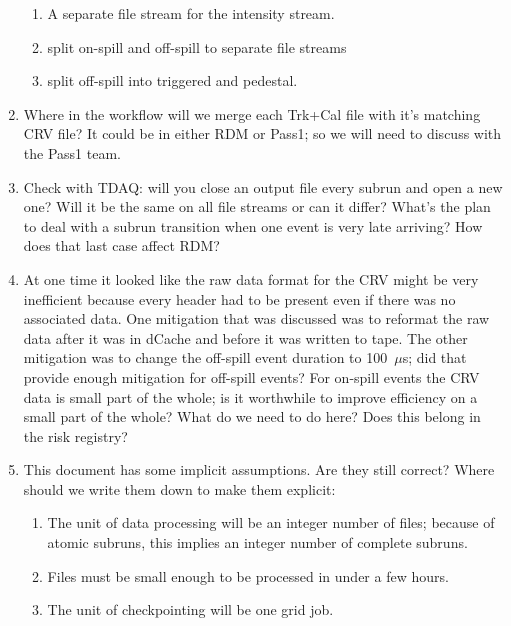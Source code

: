 \begin{enumerate}
\begin{enumerate}
      \item A separate file stream for the intensity stream.
      \item split on-spill and off-spill to separate file streams
      \item split off-spill into triggered and pedestal.
    \end{enumerate}
  \item Where in the workflow will we merge each Trk+Cal file with it's matching CRV file?
    It could be in either RDM or Pass1; so we will need to discuss with the Pass1 team.
  \item Check with TDAQ: will you close an output file every subrun and open a new one? Will it be the same
    on all file streams or can it differ?  What's the plan to deal with a subrun transition when one
    event is very late arriving?  How does that last case affect RDM?
  \item At one time it looked like the raw data format for the CRV might be very inefficient
    because every header had to be present even if there was no associated data.
    One mitigation that was discussed was to reformat the raw data after it was in dCache and before it was written to tape.
    The other mitigation was to change the off-spill event duration to 100~$\mu$s; did that provide enough mitigation for off-spill events?
    For on-spill events the CRV data is small part of the whole; is it worthwhile to improve efficiency on a small part of the whole?
    What do we need to do here?  Does this belong in the risk registry?
  \item This document has some implicit assumptions.  Are they still correct?  Where should we write them down to make them explicit:
    \begin{enumerate}
      \item The unit of data processing will be an integer number of files; because of atomic subruns, this implies an integer number
        of complete subruns.
      \item Files must be small enough to be processed in under a few hours.
      \item The unit of checkpointing will be one grid job.
    \end{enumerate}
\end{enumerate}
